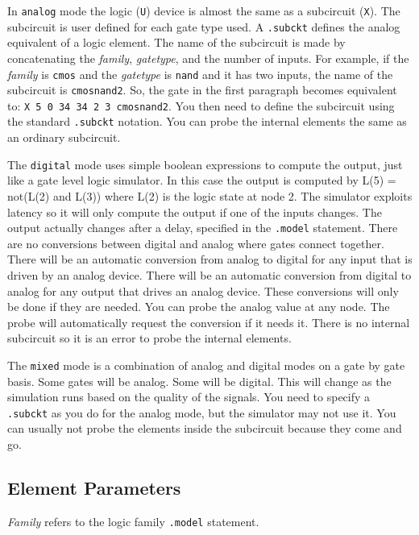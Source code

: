 In {\tt analog} mode the logic ({\tt U}) device is almost the same as
a subcircuit ({\tt X}).  The subcircuit is user defined for each gate
type used.  A {\tt .subckt} defines the analog equivalent of a logic
element.  The name of the subcircuit is made by concatenating the {\em
family}, {\em gatetype}, and the number of inputs.  For example, if
the {\em family} is {\tt cmos} and the {\em gatetype} is {\tt nand}
and it has two inputs, the name of the subcircuit is {\tt cmosnand2}.
So, the gate in the first paragraph becomes equivalent to: 
{\tt X 5 0 34 34 2 3 cmosnand2}.  You then need to define the
subcircuit using the standard {\tt .subckt} notation.  You can probe
the internal elements the same as an ordinary subcircuit.

The {\tt digital} mode uses simple boolean expressions to compute the
output, just like a gate level logic simulator.  In this case the
output is computed by L(5) = not(L(2) and L(3)) where L(2) is the
logic state at node 2.  The simulator exploits latency so it will only
compute the output if one of the inputs changes.  The output actually
changes after a delay, specified in the {\tt .model} statement.  There
are no conversions between digital and analog where gates connect
together.  There will be an automatic conversion from analog to
digital for any input that is driven by an analog device.  There will
be an automatic conversion from digital to analog for any output that
drives an analog device.  These conversions will only be done if they
are needed.  You can probe the analog value at any node.  The probe
will automatically request the conversion if it needs it.  There is no
internal subcircuit so it is an error to probe the internal elements.

The {\tt mixed} mode is a combination of analog and digital modes on a
gate by gate basis.  Some gates will be analog.  Some will be digital.
This will change as the simulation runs based on the quality of the
signals.  You need to specify a {\tt .subckt} as you do for the analog
mode, but the simulator may not use it.  You can usually not probe the
elements inside the subcircuit because they come and go.
\subsection{Element Parameters}

{\em Family} refers to the logic family {\tt .model} statement.

